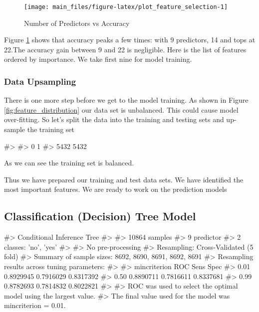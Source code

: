 \begin{Schunk}
\begin{figure}[H]

{\centering \texttt{[image: main\_files/figure-latex/plot\_feature\_selection-1]} 

}

\caption[Number of Predictors vs Accuracy]{Number of Predictors vs Accuracy}\label{fig:plot_feature_selection}
\end{figure}
\end{Schunk}

Figure \ref{fig:plot_feature_selection} shows that accuracy peaks a few
times: with 9 predictors, 14 and tops at 22.The accuracy gain between 9
and 22 is negligible. Here is the list of features ordered by
importance. We take first nine for model training.

\hypertarget{data-upsampling}{%
\subsubsection{Data Upsampling}\label{data-upsampling}}

There is one more step before we get to the model training. As shown in
Figure \ref{fig:feature_distribution} our data set is unbalanced. This
could cause model over-fitting. So let's split the data into the
training and testing sets and up-sample the training set

\begin{Schunk}
\begin{Soutput}
#> 
#>    0    1 
#> 5432 5432
\end{Soutput}
\end{Schunk}

As we can see the training set is balanced.

Thus we have prepared our training and test data sets. We have
identified the most important features. We are ready to work on the
prediction models

\hypertarget{classification-decision-tree-model}{%
\subsection{Classification (Decision) Tree
Model}\label{classification-decision-tree-model}}

\begin{Schunk}
\begin{Soutput}
#> Conditional Inference Tree 
#> 
#> 10864 samples
#>     9 predictor
#>     2 classes: 'no', 'yes' 
#> 
#> No pre-processing
#> Resampling: Cross-Validated (5 fold) 
#> Summary of sample sizes: 8692, 8690, 8691, 8692, 8691 
#> Resampling results across tuning parameters:
#> 
#>   mincriterion  ROC        Sens       Spec     
#>   0.01          0.8929945  0.7916029  0.8317392
#>   0.50          0.8890711  0.7816611  0.8337681
#>   0.99          0.8782693  0.7814832  0.8022821
#> 
#> ROC was used to select the optimal model using the largest value.
#> The final value used for the model was mincriterion = 0.01.
\end{Soutput}
\end{Schunk}

